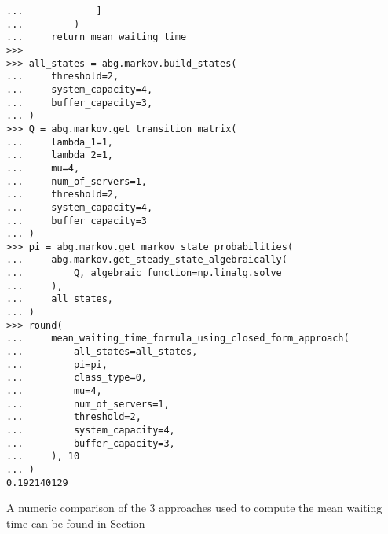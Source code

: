 \begin{lstlisting}[style=pystyle]
...             ]
...         )
...     return mean_waiting_time
>>>
>>> all_states = abg.markov.build_states(
...     threshold=2,
...     system_capacity=4,
...     buffer_capacity=3,
... )
>>> Q = abg.markov.get_transition_matrix(
...     lambda_1=1,
...     lambda_2=1,
...     mu=4,
...     num_of_servers=1,
...     threshold=2,
...     system_capacity=4,
...     buffer_capacity=3
... )
>>> pi = abg.markov.get_markov_state_probabilities(
...     abg.markov.get_steady_state_algebraically(
...         Q, algebraic_function=np.linalg.solve
...     ),
...     all_states,
... )
>>> round(
...     mean_waiting_time_formula_using_closed_form_approach(
...         all_states=all_states,
...         pi=pi,
...         class_type=0,
...         mu=4,
...         num_of_servers=1,
...         threshold=2,
...         system_capacity=4,
...         buffer_capacity=3,
...     ), 10
... )
0.192140129

\end{lstlisting}

A numeric comparison of the 3 approaches used to compute the mean waiting time
can be found in Section 
